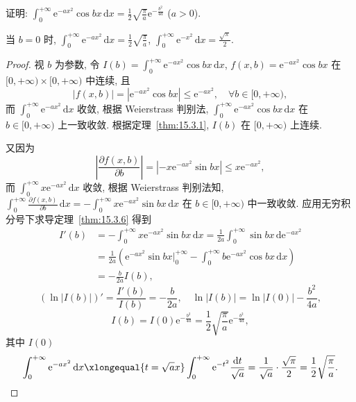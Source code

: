 \begin{example}\label{ex:15.3.4}
证明: $\displaystyle\int_{0}^{+\infty}\mathrm{e}^{-ax^{2}}\cos bx\,\mathrm{d}x=\frac{1}{2}\sqrt{\frac{\pi}{a}}\mathrm{e}^{-\frac{b^{2}}{4a}}$ ($a>0$).

当 $b=0$ 时, $\displaystyle\int_{0}^{+\infty}\mathrm{e}^{-ax^{2}}\,\mathrm{d}x=\frac{1}{2}\sqrt{\frac{\pi}{a}}$, $\displaystyle\int_{0}^{+\infty}\mathrm{e}^{-x^{2}}\,\mathrm{d}x=\frac{\sqrt{\pi}}{2}$.
\end{example}

\begin{proof}
视 $b$ 为参数, 令 $I(b)=\displaystyle\int_{0}^{+\infty}\mathrm{e}^{-ax^{2}}\cos bx\,\mathrm{d}x$, $f(x,b)=\mathrm{e}^{-ax^{2}}\cos bx$ 在 $[0,+\infty)\times[0,+\infty)$ 中连续, 且
\[
  |f(x,b)|=|\mathrm{e}^{-ax^{2}}\cos bx|\leqslant\mathrm{e}^{-ax^{2}},\quad\forall b\in[0,+\infty),
\]
而 $\displaystyle\int_{0}^{+\infty}\mathrm{e}^{-ax^{2}}\,\mathrm{d}x$ 收敛, 根据 Weierstrass 判别法, $\displaystyle\int_{0}^{+\infty}\mathrm{e}^{-ax^{2}}\cos bx\,\mathrm{d}x$ 在 $b\in[0,+\infty)$ 上一致收敛. 根据定理~\ref{thm:15.3.1}, $I(b)$ 在 $[0,+\infty)$ 上连续.

又因为
\[
  \left|\frac{\partial f(x,b)}{\partial b}\right|=|-x\mathrm{e}^{-ax^{2}}\sin bx|\leqslant x\mathrm{e}^{-ax^{2}},
\]
而 $\displaystyle\int_{0}^{+\infty}x\mathrm{e}^{-ax^{2}}\,\mathrm{d}x$ 收敛, 根据 Weierstrass 判别法知, $\displaystyle\int_{0}^{+\infty}\frac{\partial f(x,b)}{\partial b}\,\mathrm{d}x=-\int_{0}^{+\infty}x\mathrm{e}^{-ax^{2}}\sin bx\,\mathrm{d}x$ 在 $b\in[0,+\infty)$ 中一致收敛. 应用无穷积分号下求导定理~\ref{thm:15.3.6} 得到
\[
  \begin{aligned}
    I'(b)&=-\int_{0}^{+\infty}x\mathrm{e}^{-ax^{2}}\sin bx\,\mathrm{d}x=\frac{1}{2a}\int_{0}^{+\infty}\sin bx\,\mathrm{d}\mathrm{e}^{-ax^{2}}\\
    &=\frac{1}{2a}\left(\mathrm{e}^{-ax^{2}}\sin bx\bigg|_{0}^{+\infty}-\int_{0}^{+\infty}b\mathrm{e}^{-ax^{2}}\cos bx\,\mathrm{d}x\right)\\
    &=-\frac{b}{2a}I(b),
  \end{aligned}
\]
\[
  (\ln|I(b)|)'=\frac{I'(b)}{I(b)}=-\frac{b}{2a},\quad\ln|I(b)|=\ln|I(0)|-\frac{b^{2}}{4a},
\]
\[
  I(b)=I(0)\mathrm{e}^{-\frac{b^{2}}{4a}}=\frac{1}{2}\sqrt{\frac{\pi}{a}}\mathrm{e}^{-\frac{b^{2}}{4a}},
\]
其中 $I(0)$
\[
  \int_{0}^{+\infty}\mathrm{e}^{-ax^{2}}\,\mathrm{d}x\xlongequal{t=\sqrt{a}x}\int_{0}^{+\infty}\mathrm{e}^{-t^{2}}\frac{\mathrm{d}t}{\sqrt{a}}=\frac{1}{\sqrt{a}}\cdot\frac{\sqrt{\pi}}{2}=\frac{1}{2}\sqrt{\frac{\pi}{a}}.
\]
\end{proof}

